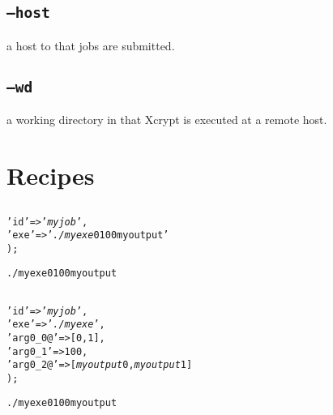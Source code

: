 \documentclass[a4paper,10pt]{report}
\begin{document}
\section{\texttt{--host}}

a host to that jobs are submitted.

\section{\texttt{--wd}}

a working directory in that Xcrypt is executed at a remote host.

\appendix

\chapter{Recipes}

\section{}

\begin{boxnote}
\begin{alltt}
%myjob = (
    'id' => '\textit{myjob}',
    'exe' => '\textit{./myexe} 0 100 myoutput'
);
\end{alltt}
\end{boxnote}

\begin{boxnote}
\begin{alltt}
./myexe 0 100 myoutput
\end{alltt}
\end{boxnote}

\section{}

\begin{boxnote}
\begin{alltt}
%myjob = (
    'id' => '\textit{myjob}',
    'exe' => '\textit{./myexe}',
    'arg0_0@' => [0,1],
    'arg0_1' => 100,
    'arg0_2@' => [\textit{myoutput}0,\textit{myoutput}1]
);
\end{alltt}
\end{boxnote}

\begin{boxnote}
\begin{alltt}
./myexe 0 100 myoutput
\end{alltt}
\end{boxnote}
\end{document}
